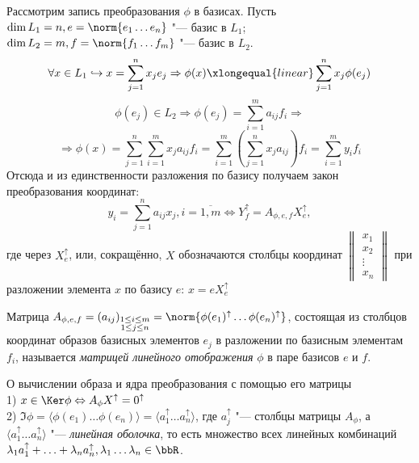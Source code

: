 Рассмотрим запись преобразования $\phi$  в базисах. Пусть $\dim L_1 = n, e=\norm{e_1 \ldots e_n}$ "--- базис в $L_1$; $\dim L_2 = m, f=\norm{f_1 \ldots f_m}$ "--- базис в $L_2$.
\begin{equation*}
\forall x \in L_1 \hookrightarrow x=\sum_{j=1}^n x_je_j \Rightarrow \phi(x)\xlongequal{linear}\sum_{j=1}^n x_j\phi(e_j) 
\end{equation*}
\begin{equation*}
\phi(e_j) \in L_2 \Rightarrow \phi(e_j)=\sum_{i=1}^m a_{ij}f_i \Rightarrow 
\end{equation*}
\begin{equation*}
\Rightarrow \phi(x)=\sum_{j=1}^n\sum_{i=1}^m x_ja_{ij}f_i = \sum_{i=1}^m(\sum_{j=1}^n x_ja_{ij})f_i = \sum_{i=1}^m y_if_i
\end{equation*}
Отсюда и из единственности разложения по базису получаем закон преобразования координат:
\begin{equation}
y_i=\sum_{j=1}^n a_{ij}x_j, i=\overline{1,m} \Leftrightarrow Y_f^\uparrow=A_{\phi,e,f}X_e^\uparrow,
\end{equation}
где через $X_e^\uparrow$, или, сокращённо, $X$ обозначаются столбцы координат $\begin{Vmatrix}
x_1 \\ x_2 \\ \vdots \\ x_n
\end{Vmatrix}$ при разложении элемента $x$ по базису $e$: $x=e X_e^\uparrow$
\begin{defn}
Матрица $A_{\phi,e,f}=(a_{ij})_{\substack{ 1\le i\le m \\ 1\le j\le n }}=\norm{\phi(e_1)^\uparrow \ldots \phi(e_n)^\uparrow}$, состоящая из столбцов координат образов базисных элементов $e_j$ в разложении по базисным элементам $f_i$, называется \textit{матрицей линейного отображения} $\phi$ в паре базисов $e$ и $f$.
\end{defn}
\begin{stt}\label{22.1.KerIm} {О вычислении образа и ядра преобразования с помощью его матрицы} $ $\\
1) $x \in \Ker\phi \Leftrightarrow A_\phi X^\uparrow=0^\uparrow$ \\
2) $\Im\phi=\langle\phi(e_1) \ldots \phi(e_n)\rangle=\langle a_1^\uparrow \ldots a_n^\uparrow\rangle$, где $a_j^\uparrow$ "--- столбцы матрицы $A_\phi$, а $\langle a_1^\uparrow \ldots a_n^\uparrow\rangle$ "--- \textit{линейная оболочка}, то есть множество всех линейных комбинаций $\lambda_1 a_1^\uparrow + \ldots + \lambda_n a_n^\uparrow, \lambda_1\ldots\lambda_n \in \bbR$.
\end{stt}
